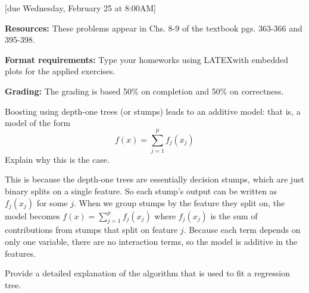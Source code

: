 \documentclass{article}
\begin{document}
[due Wednesday, February 25 at 8:00AM]

\textbf{Resources:} These problems appear in Chs. 8-9 of the textbook pgs. 363-366 and 395-398.

\textbf{Format requirements:} Type your homeworks using LATEXwith embedded plots for the applied exercises.

\textbf{Grading:} The grading is based 50\% on completion and 50\% on correctness.

\vspace{1em}

\begin{probset}

\begin{prob} 
    Boosting using depth-one trees (or stumps) leads to an additive model: that is, a model of the form $$f(x) = \sum_{j=1}^p f_j(x_j)$$ Explain why this is the case.

    \begin{soln}
        This is because the depth-one trees are essentially decision stumps, which are just binary splits on a single feature. So each stump's output can be written as $f_j(x_j)$ for some $j$. When we group stumps by the feature they split on, the model becomes $f(x) = \sum_{j=1}^p f_j(x_j)$ where $f_j(x_j)$ is the sum of contributions from stumps that split on feature $j$. Because each term depends on only one variable, there are no interaction terms, so the model is additive in the features.
    \end{soln}
\end{prob}

\begin{prob}
    Provide a detailed explanation of the algorithm that is used to fit a regression tree.


\end{prob}
\end{probset}
\end{document}
